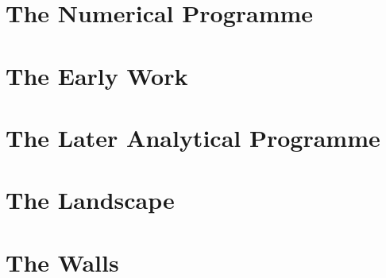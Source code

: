 \documentclass[11pt]{book}
\theoremstyle{definition}
\theoremstyle{remark}
\begin{document}
\part{The Numerical Programme}




\part{The Early Work}





\part{The Later Analytical Programme}






\part{The Landscape}




\part{The Walls}


\end{document}
